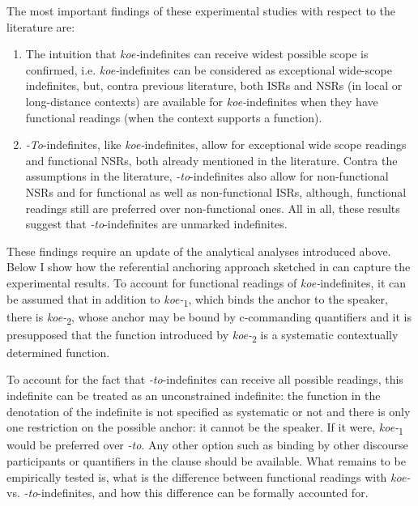 \documentclass[output=paper,colorlinks,citecolor=brown]{langscibook}
\begin{document}
\noindent The most important findings of these experimental studies with respect to the literature are:

\begin{enumerate}
    \item The intuition that \textit{koe-}indefinites can receive widest possible scope is confirmed, i.e. \textit{koe-}indefinites can be considered as exceptional wide-scope indefinites, but, contra previous literature, both ISRs and NSRs (in local or long-distance contexts) are available for \textit{koe-}indefinites when they have functional readings (when the context supports a function).
    \item \textit{-To}-indefinites, like \textit{koe-}indefinites, allow for exceptional wide scope readings and functional NSRs, both already mentioned in the literature. Contra the assumptions in the literature, \textit{-to}-indefinites also allow for non-functional NSRs and for functional as well as non-functional ISRs, although, functional readings still are preferred over non-functional ones. All in all, these results suggest that \textit{-to}-indefinites are unmarked indefinites.
\end{enumerate}

These findings require an update of the analytical analyses introduced above. Below I show how the referential anchoring approach sketched in  can capture the experimental results. To account for functional readings of \textit{koe-}indefinites, it can be assumed that in addition to \textit{koe-}\textsubscript{1}, which binds the anchor to the speaker, there is \textit{koe-}\textsubscript{2}, whose anchor may be bound by c-commanding quantifiers and it is presupposed that the function introduced by \textit{koe-}\textsubscript{2} is a systematic contextually determined function.

To account for the fact that \textit{-to}-indefinites can receive all possible readings, this indefinite can be treated as an unconstrained indefinite: the function in the denotation of the indefinite is not specified as systematic or not and there is only one restriction on the possible anchor: it cannot be the speaker.  If it were, \textit{koe-}\textsubscript{1} would be preferred over \textit{-to}. Any other option such as binding by other discourse participants or quantifiers in the clause should be available. What remains to be empirically tested is, what is the difference between functional readings with \textit{koe-} vs. \textit{-to}-indefinites, and how this difference can be formally accounted for.
\end{document}
